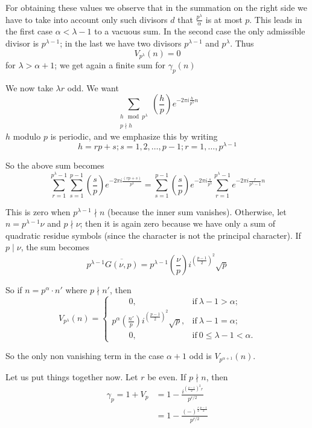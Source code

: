 For obtaining these values we observe that in the summation on the
right side we have to take into account only such divisors $d$ that
$\frac{p^\lambda}{\alpha}$ is at most $p$. This leads in the first
case $\alpha < \lambda -1$ to a vacuous sum. In the second case the
only admissible divisor is $p^{\lambda-1}$; in the last we have two
divisors $p^{\lambda -1}$ and $p^\lambda$. Thus
$$
V_{p^\lambda} (n)=0
$$ 
for $\lambda > \alpha +1$; we get again a finite sum for $\gamma_p
(n)$

We now take $\lambda r$ odd. We want
$$
\sum_{\substack{h \mod p^\lambda\\ p \nmid h}}
\left(\frac{h}{p}\right) e^{-2 \pi i \frac{h}{p^\lambda} n}
$$
$h$ modulo $p$ is periodic, and we emphasize this by writing
$$
h= r p+ s; s=1, 2, \ldots, p-1; r=1, \ldots, p^{\lambda-1}
$$\pageoriginale

So the above sum becomes
$$
\sum^{p^\lambda -1}_{r=1} \sum^{p-1}_{s=1} \left(\frac{s}{p}\right)
e^{- 2 \pi i \frac{(rp+s)}{p^\lambda}} = \sum^{p-1}_{s=1}
\left(\frac{s}{p}\right) e^{- 2\pi i \frac{s}{p^\lambda}}
\sum^{p^\lambda -1}_{r=1} e^{- 2 \pi i \frac{r}{p^\lambda -1}n}
$$

This is zero when $p^{\lambda-1}\nmid n$ (because the inner sum
vanishes). Otherwise, let $n= p^{\lambda -1}\nu$ and $p \nmid \nu$;
then it is again zero because we have only a sum of quadratic residue
symbols (since the character is not the principal character). If
$p\mid \nu$, the sum becomes
$$
p^{\lambda -1} \overline{G(\nu, p)}= p^{\lambda -1}
\left(\frac{\nu}{p}\right) i^{\left(\frac{p-1}{2}\right)^2} \sqrt{p}
$$

So if $n= p^\alpha \cdot n'$ where $p \nmid n'$, then
$$
V_{p^\lambda} (n)=
\begin{cases}
  \qquad 0 , & \text{if}~ \lambda -1 > \alpha;\\
  p^\alpha \left(\frac{n'}{p}\right) i^{\left(\frac{p-1}{2}\right)^2} \sqrt{p},
  & \text{if}~ \lambda -1 = \alpha;\\
  \qquad 0, & \text{if}~ 0 \leq \lambda -1 < \alpha. 
\end{cases}
$$

So the only non vanishing term in the case $\alpha + 1$ odd is
$V_{p^{\alpha+1}}(n)$.

Let us put things together now. Let $r$ be even. If $p \nmid n$,
then 
\begin{align*}
  \gamma_p = 1+ V_p & = 1- \frac{i^{\left(\frac{p-1}{2}\right)^2
      r}}{p^{r/2}}\\
  & = 1- \frac{(-)^{\frac{r}{2} \frac{p-1}{2}}}{p^{r/2}}
\end{align*}\pageoriginale

